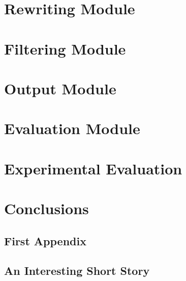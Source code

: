 \documentclass[pdftex]{pucthesis}	%
\begin{document}
\chapter[REWRITING MODULE]{Rewriting Module} \label{chpt:rewriting}


\chapter[FILTERING MODULE]{Filtering Module} \label{chpt:filtering}


\chapter[OUTPUT MODULE]{Output Module} \label{chpt:output}


\chapter[EVALUATION MODULE]{Evaluation Module} \label{chpt:evaluation}


\chapter[EXPERIMENTAL EVALUATION]{Experimental Evaluation} \label{chpt:experiments}


\chapter[CONCLUSIONS]{Conclusions} \label{chpt:conclusions}



\cleardoublepage
{} \label{references}

\renewcommand{\bibname}{REFERENCES}



\appendix %

\newpage
\section[First Appendix]{First Appendix}


\newpage
\section[An Interesting Short Story]{An Interesting Short Story}

\end{document}
